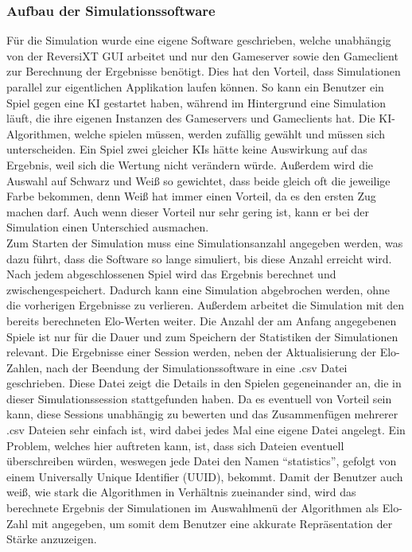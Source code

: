 \documentclass[12pt,a4paper,bibliography=totocnumbered,listof=totocnumbered]{article}
\begin{document}
\subsubsection{Aufbau der Simulationssoftware}
Für die Simulation wurde eine eigene Software geschrieben, welche unabhängig von der \ac{ReversiXT} \ac{GUI} arbeitet und nur den Gameserver 
sowie den Gameclient zur Berechnung der Ergebnisse benötigt. Dies hat den Vorteil, dass Simulationen parallel zur eigentlichen Applikation laufen können.
So kann ein Benutzer ein Spiel gegen eine \ac{KI} gestartet haben, während im Hintergrund eine Simulation läuft, die ihre eigenen Instanzen des 
Gameservers und Gameclients hat. 
Die \ac{KI}-Algorithmen, welche spielen müssen, werden zufällig gewählt und müssen sich unterscheiden. Ein Spiel zwei gleicher KIs hätte keine Auswirkung auf das 
Ergebnis, weil sich die Wertung nicht verändern würde. Außerdem wird die Auswahl auf Schwarz und Weiß so gewichtet, dass beide gleich oft die jeweilige Farbe bekommen, 
denn Weiß hat immer einen Vorteil, da es den ersten Zug machen darf. Auch wenn dieser 
Vorteil nur sehr gering ist, kann er bei der Simulation einen Unterschied ausmachen.
\\
Zum Starten der Simulation muss eine Simulationsanzahl angegeben werden, was dazu führt, dass die Software so lange simuliert, bis diese Anzahl erreicht wird.
Nach jedem abgeschlossenen Spiel wird das Ergebnis berechnet und zwischengespeichert. Dadurch kann eine Simulation abgebrochen werden, ohne die vorherigen 
Ergebnisse zu verlieren. Außerdem arbeitet die Simulation mit den bereits berechneten Elo-Werten weiter. Die Anzahl der am Anfang angegebenen 
Spiele ist nur für die Dauer und zum Speichern der Statistiken der Simulationen relevant. 
Die Ergebnisse einer Session werden, neben der Aktualisierung der Elo-Zahlen, nach der Beendung der Simulationssoftware in eine .csv Datei 
geschrieben. Diese Datei zeigt die Details in den Spielen gegeneinander an, die in dieser Simulationssession stattgefunden haben.
Da es eventuell von Vorteil sein kann, diese Sessions unabhängig zu bewerten und das Zusammenfügen mehrerer .csv Dateien sehr einfach ist, 
wird dabei jedes Mal eine eigene Datei angelegt. Ein Problem, welches hier auftreten kann, ist, dass sich Dateien eventuell überschreiben würden, weswegen 
jede Datei den Namen ``statistics'', gefolgt von einem Universally Unique Identifier (UUID), bekommt.
Damit der Benutzer auch weiß, wie stark die Algorithmen in Verhältnis zueinander sind, wird das berechnete Ergebnis der Simulationen im Auswahlmenü der 
Algorithmen als Elo-Zahl mit angegeben, um somit dem Benutzer eine akkurate Repräsentation der Stärke anzuzeigen.
\end{document}
